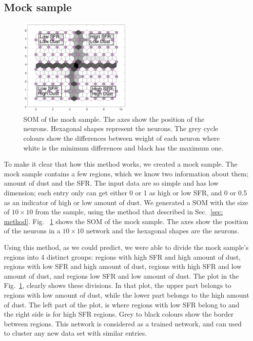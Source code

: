   
     
    
\subsection{Mock sample}
\label{sec: mock_sample}
 
         \begin{figure}
                \centering
                \includegraphics[width=0.5\textwidth]{../images0.01/mock_sample.png}
            \caption{SOM of the mock sample. The axes show the position of the neurons. Hexagonal shapes represent the neurons. The grey cycle colours show the differences between weight of each neuron where white is the minimum differences and black has the maximum one.}
            \label{fig: sample}
        \end{figure}
 
 To make it clear that how this method works, we created a mock sample.
 The mock sample contains a few regions, which we know two information about them; amount of dust and the SFR.
 The input data are so simple and has low dimension; each entry only can get either 0 or 1 as high or low SFR, and 0 or 0.5 as an indicator of high or low amount of dust.
 We generated a SOM with the size of $10 \times 10$ from the sample, using the method that described in Sec.~\ref{sec: method}.
 Fig. ~\ref{fig: sample} shows the SOM of the mock sample. 
 The axes show the position of the neurons in a $10 \times 10$ network and the hexagonal shapes are the neurons.
 
 
Using this method, as we could predict, we were able to divide the mock sample's regions into 4 distinct groups: regions with high SFR and high amount of dust, regions with low SFR and high amount of dust, regions with high SFR and low amount of dust, and regions low SFR and low amount of dust. 
The plot in the Fig.~\ref{fig: sample}, clearly shows these divisions.
In that plot, the upper part belongs to regions with low amount of dust, while the lower part belongs to the high amount of dust.
The left part of the plot, is where regions with low SFR belong to and the right side is for high SFR regions.
Grey to black colours show the border between regions.
This network is considered as a trained network, and can used to cluster any new data set with similar entries.

